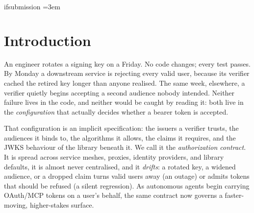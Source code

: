 \ifdefined\ifsubmission\else\expandafter\newif\csname ifsubmission\endcsname\submissiontrue\fi
\providecommand{\gate}[1]{\ifsubmission #1\else \textbf{[PENDING: #1]}\fi}
\providecommand{\draftonly}[1]{\ifsubmission\else \textbf{[NOTE: #1]}\fi}
\emergencystretch=3em

\ifdefined\keywayabstractdone\else\fi

\section{Introduction}
An engineer rotates a signing key on a Friday. No code changes; every test passes.
By Monday a downstream service is rejecting every valid user, because its verifier
cached the retired key longer than anyone realised. The same week, elsewhere, a
verifier quietly begins accepting a second audience nobody intended. Neither
failure lives in the code, and neither would be caught by reading it: both live in
the \emph{configuration} that actually decides whether a bearer token is accepted.

That configuration is an implicit specification: the issuers a verifier trusts,
the audiences it binds to, the algorithms it allows, the claims it requires, and
the JWKS behaviour of the library beneath it. We call it the \emph{authorization
contract}. It is spread across service meshes, proxies, identity providers, and
library defaults, it is almost never centralised, and it \emph{drifts}: a rotated
key, a widened audience, or a dropped claim turns valid users away (an outage) or
admits tokens that should be refused (a silent regression). As autonomous agents
begin carrying OAuth/MCP tokens on a user's behalf, the same contract now governs a
faster-moving, higher-stakes surface.

